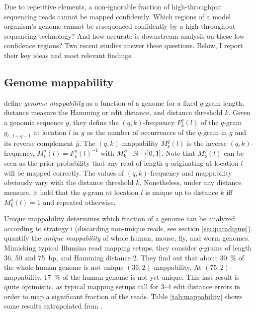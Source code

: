 Due to repetitive elements, a non-ignorable fraction of high-throughput sequencing reads cannot be mapped confidently.
Which regions of a model organism's genome cannot be resequenced confidently by a high-throughput sequencing technology?
And how accurate is downstream analysis on these low confidence regions?
Two recent studies \citep{Derrien2012, Lee2012} answer these questions.
Below, I report their key ideas and most relevant findings.

\subsection{Genome mappability}

\citeauthor{Derrien2012} define \emph{genome mappability} as a function of a genome for a fixed $q$-gram length, distance measure \ie the Hamming or edit distance, and distance threshold $k$.
Given a genomic sequence $g$, they define the $(q,k)$-frequency $F^q_k(l)$ of the $q$-gram $g_{l \dots l+q-1}$ at location $l$ in $g$ as the number of occurrences of the $q$-gram in $g$ and its reverse complement $\bar{g}$.
The $(q,k)$-mappability $M^q_k(l)$ is the inverse $(q,k)$-frequency, \ie $M^q_k(l) = {F^q_k(l)}^{-1}$ with $M^q_k : \mathbb {N} \rightarrow ]0,1]$.
Note that $M^q_k(l)$ can be seen as the prior probability that any read of length $q$ originating at location $l$ will be mapped correctly.
The values of $(q,k)$-frequency and mappability obviously vary with the distance threshold $k$. Nonetheless, under any distance measure, it hold that the $q$-gram at location $l$ is unique up to distance $k$ iff $M^q_k(l) = 1$ and repeated otherwise.

Unique mappability determines which fraction of a genome can be analyzed according to strategy i (\ie discarding non-unique reads, see section \ref{sec:paradigms}).
\citeauthor{Derrien2012} quantify the \emph{unique mappability} of whole human, mouse, fly, and worm genomes.
Mimicking typical Illumina read mapping setups, they consider $q$-grams of length 36, 50 and 75~bp, and Hamming distance 2.
They find out that about 30~\% of the whole human genome is not unique \wrt $(36,2)$-mappability.
At $(75,2)$-mappability, 17~\% of the human genome is not yet unique.
This last result is quite optimistic, as typical mapping setups call for 3--4 edit distance errors in order to map a significant fraction of the reads.
Table \ref{tab:mappability} shows some results extrapolated from \citep{Derrien2012}.


